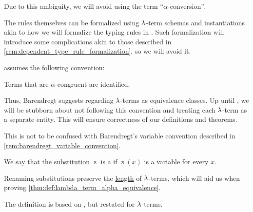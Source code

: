 \begin{comments}
  Due to this ambiguity, we will avoid using the term \enquote{\( \alpha \)-conversion}.

  \item The rules themselves can be formalized using \( {\mathrm \lambda} \)-term schemas and instantiations akin to how we will formalize the typing rules in . Such formalization will introduce some complications akin to those described in \cref{rem:dependent_type_rule_formalization}, so we will avoid it.
\end{comments}

\begin{remark}\label{rem:barendregt_convention}
   assumes the following convention:
  \begin{displayquote}
    Terms that are \( \alpha \)-congruent are identified.
  \end{displayquote}

  Thus, Barendregt suggests regarding \( {\mathrm \lambda} \)-terms as equivalence classes. Up until , we will be stubborn about not following this convention and treating each \( {\mathrm \lambda} \)-term as a separate entity. This will ensure correctness of our definitions and theorems.
\end{remark}
\begin{comments}
  \item This is not to be confused with Barendregt's variable convention described in \cref{rem:barendregt_variable_convention}.
\end{comments}

\begin{definition}\label{def:lambda_renaming}
  We say that the \hyperref[def:lambda_term_substitution]{substitution} \( \Bbbs \) is a  if \( \Bbbs(x) \) is a variable for every \( x \).
\end{definition}
\begin{comments}
  \item Renaming substitutions preserve the \hyperref[def:lambda_term_length]{length} of \( {\mathrm \lambda} \)-terms, which will aid us when proving \cref{thm:def:lambda_term_alpha_equivalence}.

  \item The definition is based on \cite[252]{Mimram2020ProgramEqualsProof}, but restated for \( {\mathrm \lambda} \)-terms.
\end{comments}

